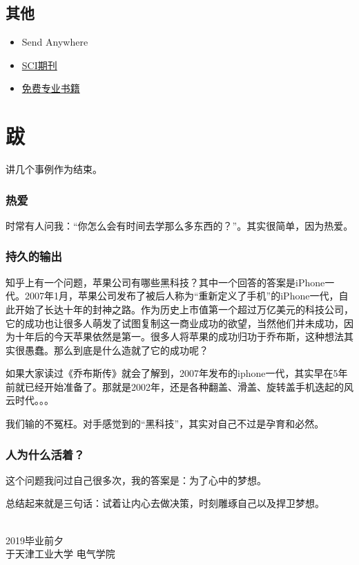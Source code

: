 \documentclass[UTF8,oneside]{ctexbook}
\begin{document}
\section{其他}
\begin{itemize}
	\item Send Anywhere
	\item \href{https://www.scimagojr.com}{SCI期刊}
	\item \href{http://libgen.io}{免费专业书籍}
\end{itemize}

\backmatter
\chapter*{跋}
讲几个事例作为结束。

\subsection*{热爱}
时常有人问我：“你怎么会有时间去学那么多东西的？”。其实很简单，因为热爱。

\subsection*{持久的输出}
知乎上有一个问题，苹果公司有哪些黑科技？其中一个回答的答案是iPhone一代。2007年1月，苹果公司发布了被后人称为“重新定义了手机”的iPhone一代，自此开始了长达十年的封神之路。作为历史上市值第一个超过万亿美元的科技公司，它的成功也让很多人萌发了试图复制这一商业成功的欲望，当然他们并未成功，因为十年后的今天苹果依然是第一。很多人将苹果的成功归功于乔布斯，这种想法其实很愚蠢。那么到底是什么造就了它的成功呢？

如果大家读过《乔布斯传》就会了解到，2007年发布的iphone一代，其实早在5年前就已经开始准备了。那就是2002年，还是各种翻盖、滑盖、旋转盖手机迭起的风云时代。。。

我们输的不冤枉。对手感觉到的“黑科技”，其实对自己不过是孕育和必然。

\subsection*{人为什么活着？}
这个问题我问过自己很多次，我的答案是：为了心中的梦想。

\vspace{2cm}
总结起来就是三句话：试着让内心去做决策，时刻雕琢自己以及捍卫梦想。

\hspace{4cm}\\
\noindent2019毕业前夕\\
于天津工业大学 \quad 电气学院
\end{document}
